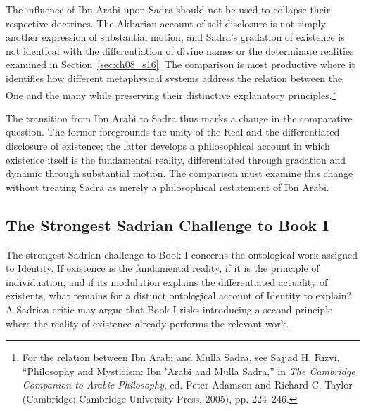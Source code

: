 \label{para:VS.B01.P01.C08.S17.SS14.P003}

The influence of Ibn Arabi
upon Sadra should not
be used to collapse their
respective doctrines. The
Akbarian account of
self-disclosure is not
simply another expression
of substantial motion,
and Sadra's gradation
of existence is not
identical with the
differentiation of divine
names or the determinate
realities examined in
Section~\ref{sec:ch08_s16}.
The comparison is most
productive where it
identifies how different
metaphysical systems
address the relation
between the One and
the many while preserving
their distinctive explanatory
principles.\footnote{For the
relation between Ibn Arabi
and Mulla Sadra, see Sajjad
H. Rizvi, ``Philosophy and
Mysticism: Ibn 'Arabi and
Mulla Sadra,'' in
\textit{The Cambridge Companion
to Arabic Philosophy}, ed.
Peter Adamson and Richard C.
Taylor (Cambridge: Cambridge
University Press, 2005),
pp. 224--246.}

\label{para:VS.B01.P01.C08.S17.SS14.P004}

The transition from Ibn Arabi
to Sadra thus marks a
change in the comparative
question. The former
foregrounds the unity
of the Real and the
differentiated disclosure
of existence; the latter
develops a philosophical
account in which existence
itself is the fundamental
reality, differentiated
through gradation and
dynamic through substantial
motion. The comparison
must examine this change
without treating Sadra
as merely a philosophical
restatement of Ibn Arabi.




\subsection{The Strongest Sadrian Challenge to Book I}
\label{subsec:ch08_s17_ss15}

\label{para:VS.B01.P01.C08.S17.SS15.P001}

The strongest Sadrian challenge
to Book I concerns the
ontological work assigned
to Identity. If existence
is the fundamental reality,
if it is the principle
of individuation, and
if its modulation explains
the differentiated actuality
of existents, what remains
for a distinct ontological
account of Identity to
explain? A Sadrian critic
may argue that Book I
risks introducing a
second principle where
the reality of existence
already performs the
relevant work.

